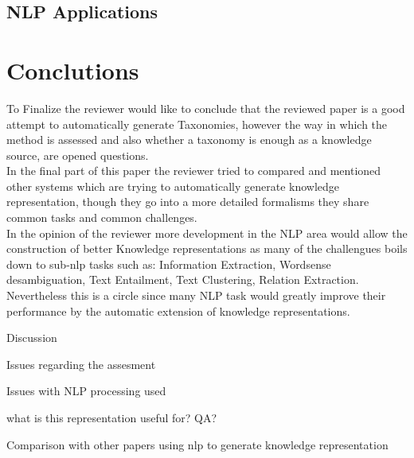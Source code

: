 \documentclass[4pt,a4paper,twocolumn]{article}
\begin{document}
\subsection*{NLP Applications}

\section{Conclutions}
To Finalize the reviewer would like to conclude that the reviewed paper is a good attempt to automatically generate Taxonomies, however the way in which the method is assessed and also whether a  taxonomy is enough as a knowledge source, are opened questions.\\
In the final part of this paper the reviewer tried to compared and mentioned other systems which are trying to automatically generate knowledge representation, though they go into a more detailed formalisms they share common tasks and common challenges.\\
In the opinion of the reviewer more development in the NLP area would allow the construction of better Knowledge representations as many of the challengues boils down to sub-nlp tasks such as: Information Extraction, Wordsense desambiguation, Text Entailment, Text Clustering, Relation Extraction.\\
Nevertheless this is a circle since many NLP task would greatly improve their performance by  the automatic extension of knowledge representations.

Discussion

Issues regarding the assesment

Issues with NLP processing used

what is this representation useful for? QA?

Comparison with other papers using nlp to generate knowledge representation







{}

\end{document}
